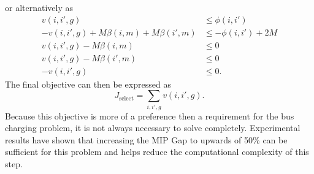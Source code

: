 or alternatively as
\begin{equation}\begin{aligned}
	v(i,i',g) &\le \phi(i,i') \\
	-v(i,i',g) + M\beta(i,m) + M\beta(i',m)&\le -\phi(i,i') + 2M \\
	v(i,i',g) - M\beta(i,m)  &\le 0 \\
	v(i,i',g) - M\beta(i',m) &\le 0\\
	-v(i,i',g) &\le 0.
\end{aligned}\end{equation}
The final objective can then be expressed as
\begin{equation}
	J_{\text{select}} = \sum_{i,i',g} v(i,i',g).
\end{equation}
Because this objective is more of a preference then a requirement for the bus charging problem, it is not always necessary to solve completely.  Experimental results have shown that increasing the MIP Gap to upwards of 50\% can be sufficient for this problem and helps reduce the computational complexity of this step.
